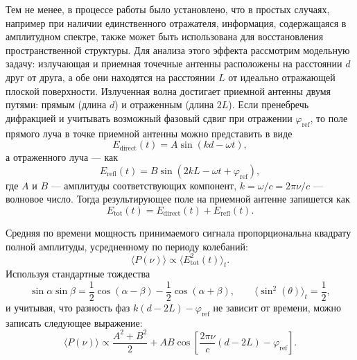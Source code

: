 Тем не менее, в процессе работы было установлено, что в простых случаях, например при наличии единственного отражателя, информация, содержащаяся в амплитудном спектре, также может быть использована для восстановления пространственной структуры. Для анализа этого эффекта рассмотрим модельную задачу: излучающая и приемная точечные антенны расположены на расстоянии $d$ друг от друга, а обе они находятся на расстоянии $L$ от идеально отражающей плоской поверхности. Излученная волна достигает приемной антенны двумя путями: прямым (длина $d$) и отраженным (длина $2L$). Если пренебречь дифракцией и учитывать возможный фазовый сдвиг при отражении $\varphi_{\mathrm{ref}}$, то поле прямого луча в точке приемной антенны можно представить в виде
\begin{equation}
    E_{\mathrm{direct}}(t) = A \sin(kd - \omega t),
\end{equation}
а отраженного луча --- как
\begin{equation}
    E_{\mathrm{refl}}(t) = B \sin(2kL - \omega t + \varphi_{\mathrm{ref}}),
\end{equation}
где $A$ и $B$ --- амплитуды соответствующих компонент, $k = \omega/c = 2\pi\nu/c$ --- волновое число. Тогда результирующее поле на приемной антенне запишется как
\begin{equation}
    E_{\mathrm{tot}}(t) = E_{\mathrm{direct}}(t) + E_{\mathrm{refl}}(t).
\end{equation}

Средняя по времени мощность принимаемого сигнала пропорциональна квадрату полной амплитуды, усредненному по периоду колебаний:
\begin{equation}
    \langle P(\nu) \rangle \propto \langle E_{\mathrm{tot}}^2(t) \rangle_t.
\end{equation}
Используя стандартные тождества
\begin{equation}
    \sin\alpha \sin\beta = \frac{1}{2}\cos(\alpha - \beta) - \frac{1}{2}\cos(\alpha + \beta),
    \qquad
    \langle \sin^2(\theta) \rangle_t = \frac{1}{2},
\end{equation}
и учитывая, что разность фаз $k(d - 2L) - \varphi_{\mathrm{ref}}$ не зависит от времени, можно записать следующее выражение:
\begin{equation}
    \langle P(\nu) \rangle \propto
    \frac{A^2 + B^2}{2} + AB \cos\left[\frac{2\pi\nu}{c}(d - 2L) - \varphi_{\mathrm{ref}}\right].
\end{equation}

